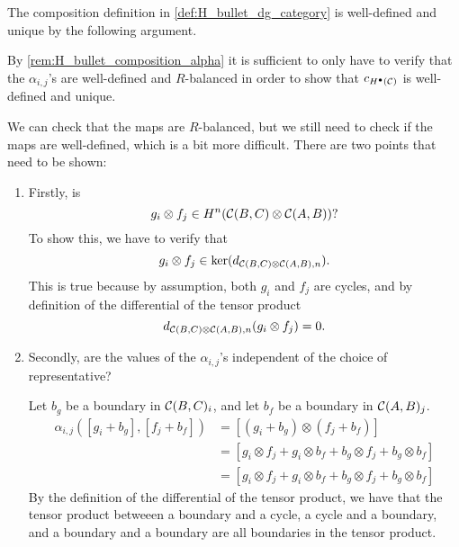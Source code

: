 \begin{remark}
    \label{rem:composition_in_H_bullet_is_well_defined}
    The composition definition in \autoref{def:H_bullet_dg_category} is well-defined and unique by the following argument.

    By \autoref{rem:H_bullet_composition_alpha} it is sufficient to only have to verify that the \( \alpha_{i, j} \)'s are well-defined and \( R \)-balanced in order to show that \( c_{H^\bullet({\mathcal{C}})} \) is well-defined and unique.

    We can check that the maps are \( R \)-balanced, but we still need to check if the maps are well-defined, which is a bit more difficult. There are two points that need to be shown:
    \begin{enumerate}
        \item {
            Firstly, is
            \[
                g_i \otimes f_j \in H^n({\mathcal{C}}(B, C) \otimes {\mathcal{C}}(A, B))?
            \]
            To show this, we have to verify that
            \[
                g_i \otimes f_j \in \ker(d_{{\mathcal{C}}(B, C) \otimes {\mathcal{C}}(A, B), n}).
            \]
            This is true because by assumption, both \( g_i \) and \( f_j \) are cycles, and by definition of the differential of the tensor product
            \[
                d_{{\mathcal{C}}(B, C) \otimes {\mathcal{C}}(A, B), n}(g_i \otimes f_j) = 0.
            \]
        }
        \item {
            Secondly, are the values of the \( \alpha_{i, j} \)'s independent of the choice of representative?

            Let \( b_g \) be a boundary in \( {\mathcal{C}}(B, C)_i \), and let \( b_f \) be a boundary in \( {\mathcal{C}}(A, B)_j \).
            \begin{align*}
                \alpha_{i, j}([g_i + b_g], [f_j + b_f]) &= [(g_i + b_g) \otimes (f_j + b_f)] \\
                &= [g_i \otimes f_j + g_i \otimes b_f + b_g \otimes f_j + b_g \otimes b_f] \\
                &= [g_i \otimes f_j + g_i \otimes b_f + b_g \otimes f_j + b_g \otimes b_f]
            \end{align*}
            By the definition of the differential of the tensor product, we have that the tensor product betweeen a boundary and a cycle, a cycle and a boundary, and a boundary and a boundary are all boundaries in the tensor product.

}
\end{enumerate}
\end{remark}
